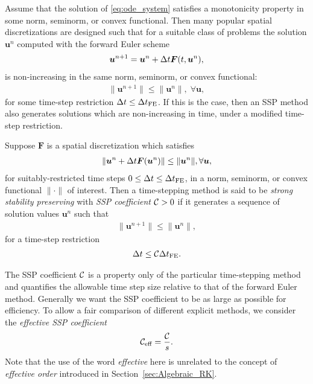 Assume that the solution of \eqref{eq:ode_system} satisfies a monotonicity 
property in some norm, seminorm, or convex functional.
Then many popular spatial discretizations are designed such that for a 
suitable class of problems the solution $\bm{u}^{n}$ computed with the
forward Euler scheme
\begin{align}\label{eq:forwardEuler}
    \bm{u}^{n+1} = \bm{u}^{n} + \Delta t\bm{F}(t,\bm{u}^{n}),
\end{align}
is non-increasing in the same norm, seminorm, or convex functional:
\begin{align*}
    \|\bm{u}^{n+1}\| \le \|\bm{u}^n\|, \; \forall \bm{u},
\end{align*}
for some time-step restriction $\Delta t \leq \Delta t_{\text{FE}}$. 
If this is the case, then an SSP method also generates solutions which are 
non-increasing in time, under a modified time-step restriction. 
\begin{definition}
	Suppose $\bm{F}$ is a spatial discretization which satisfies
	\begin{align*}
		\|\bm{u}^{n} + \Delta t\bm{F}(\bm{u}^{n})\| \le \|\bm{u}^n\|, \forall \bm{u},
	\end{align*}
	for suitably-restricted time steps $0 \le \Delta t \le \Delta t_{\text{FE}}$,
	in a norm, seminorm, or convex functional $\|\cdot\|$ of interest.
	Then a time-stepping method is said to be \emph{strong stability
  	preserving} with \emph{SSP coefficient} $\mathcal{C} > 0$ if it
	generates a sequence of solution values $\bm{u}^n$ such that
	\begin{align*}
  		\|\bm{u}^{n+1}\| \le \|\bm{u}^n\|,
	\end{align*}
	for a time-step restriction
	\begin{align*}
		\Delta t \leq \mathcal{C} \Delta t_{\text{FE}}.
	\end{align*}
\end{definition} 

The SSP coefficient $\mathcal{C}$ is a property only of the particular 
time-stepping method and quantifies the allowable time step size relative 
to that of the forward Euler method.
Generally we want the SSP coefficient to be as large as possible for efficiency.
To allow a fair comparison of different explicit methods, we consider the 
\emph{effective SSP coefficient}
\begin{align*}
	\mathcal{C}_{\text{eff}} = \frac{\mathcal{C}}{s}.
\end{align*}
Note that the use of the word \emph{effective} here is unrelated to the 
concept of \emph{effective order} introduced in Section~\ref{sec:Algebraic_RK}.


